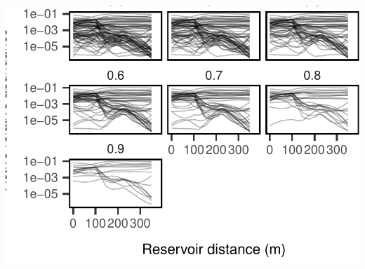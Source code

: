 \documentclass[]{article}
\begin{document}
\begin{center}\includegraphics{ReservoirGradient_files/figure-latex/unnamed-chunk-11-1} \end{center}
\end{document}
